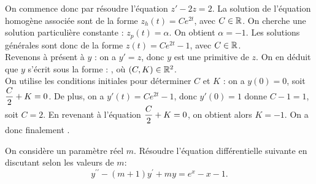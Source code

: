 \documentclass[a4paper, 11pt,reqno]{article}
\begin{document}
\begin{correction}
\begin{enumerate}
On commence donc par r\'esoudre l'\'equation $z'-2z=2$. La solution de l'\'equation homog\`ene associ\'ee sont de la forme $z_h(t) = Ce^{2t}$, avec $C\in \mathbb{R}$. On cherche une solution particuli\`ere constante : $z_p(t) = \alpha$. On obtient $\alpha = -1$. Les solutions g\'en\'erales sont donc de la forme $z(t) = Ce^{2t}-1$, avec $C \in \mathbb{R}$.\\
Revenons \`a pr\'esent \`a $y$ : on a $y'=z$, donc $y$ est une primitive de $z$. On en d\'eduit que $y$ s'\'ecrit sous la forme : , o\`u $(C,K) \in \mathbb{R}^2$.\\
On utilise les conditions initiales pour d\'eterminer $C$ et $K$ : on a $y(0)=0$, soit $\displaystyle \frac{C}{2} +K = 0$. De plus, on a $y'(t) = C e^{2t} -1$, donc $y'(0)=1$ donne $C-1 = 1$, soit $C=2$. En revenant \`a l'\'equation $\displaystyle \frac{C}{2} +K = 0$, on obtient alors $K = -1$. On a donc finalement .
\end{enumerate}
\end{correction}



\begin{exercice}  \;
On consid\`ere un param\`etre r\'eel $m$. R\'esoudre l'\'equation diff\'erentielle suivante en discutant selon les valeurs de $m$:
$$y^{\prime\prime}-(m+1)y^{\prime}+my=e^x-x-1.$$
\end{exercice}
\end{document}
